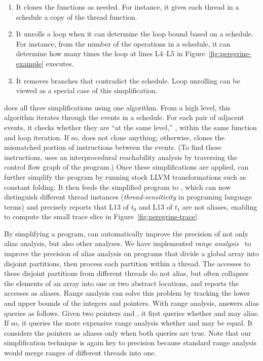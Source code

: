 \begin{enumerate}

\item It clones the functions as needed.  For instance, it gives
  each thread in a schedule a copy of the thread function.

\item It unrolls a loop when it can determine the loop bound based on a
  schedule.  For instance, from the number of the 
  operations in a schedule, it can determine how many times the loop at
  lines L4--L5 in Figure~\ref{fig:peregrine-example} executes.

\item It removes branches that contradict the schedule.  Loop unrolling
  can be viewed as a special case of this simplification.

\end{enumerate}

\peregrine does all three simplifications using one algorithm.  From a high
level, this algorithm iterates through the events in a schedule.  For each
pair of adjacent events, it checks whether they are ``at the same level,''
\ie, within the same function and loop iteration.  If so, \peregrine does
not clone anything; otherwise, \peregrine clones the mismatched portion of
instructions between the events.  (To find these instructions, \peregrine uses an
interprocedural reachability analysis by traversing the control flow graph
of the program.)  Once these simplifications are applied, \peregrine can further
simplify the program by running stock LLVM transformations such as
constant folding.  It then feeds the simplified program to \bddbddb,
which can now
distinguish different thread instances (\emph{thread-sensitivity} in
programing language terms) and precisely reports that L13
of $t_0$ and L13 of $t_1$
are not aliases, enabling \peregrine to compute the small trace slice in
Figure~\ref{fig:peregrine-trace}.

By simplifying a program, \peregrine can automatically improve the precision of
not only alias analysis, but also other analyses.  We have
implemented \emph{range analysis}~\cite{range:pldi00} to improve
the precision of alias analysis on programs
that divide a global array into disjoint partitions, then process each
partition within a thread.
The accesses to these disjoint partitions from different threads do
not alias, but \bddbddb often collapses the elements of an array into one
or two abstract locations, and reports the accesses as aliases.  Range
analysis can solve this problem by tracking the lower and upper bounds of
the integers and pointers.  With range analysis, \peregrine answers alias queries
as follows.  Given two pointers
 and , it first queries \bddbddb whether  and  may alias.
If so, it queries the more expensive range analysis whether  and
 may be equal.  It considers the pointers as aliases only when both
queries are true.  Note that our simplification technique is again key
to precision because standard range analysis would merge ranges of different threads
into one.



